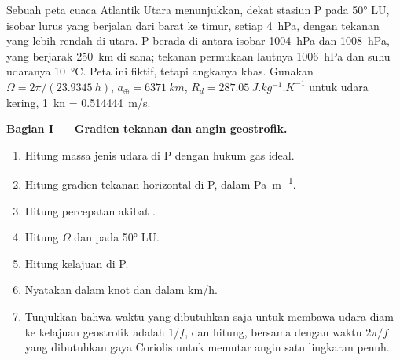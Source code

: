 \begin{problem}
\label{pb:b1:atmospheric-circulation:1}
Sebuah peta cuaca Atlantik Utara menunjukkan, dekat stasiun P pada \ang{50} LU, isobar lurus
yang berjalan dari barat ke timur, setiap \qty{4}{hPa}, dengan tekanan yang lebih rendah di utara.
P berada di antara isobar \qty{1004}{hPa} dan \qty{1008}{hPa}, yang berjarak
\qty{250}{km} di sana; tekanan permukaan lautnya \qty{1006}{hPa} dan suhu udaranya
\qty{10}{\degreeCelsius}. Peta ini fiktif, tetapi angkanya khas.
Gunakan $\Omega = 2\pi/(\qty{23.9345}{h})$, $a_\oplus = \qty{6371}{km}$, $R_d =
\qty{287.05}{J.kg^{-1}.K^{-1}}$ untuk udara kering, \qty{1}{kn} = \qty{0.514444}{m/s}.

\medskip
\noindent\textbf{Bagian I --- Gradien tekanan dan angin geostrofik.}
\begin{enumerate}
  \item Hitung massa jenis udara di P dengan hukum gas ideal.
  \item Hitung gradien tekanan horizontal di P, dalam \unit{Pa.m^{-1}}.
  \item Hitung percepatan akibat .
  \item Hitung $\Omega$ dan  pada \ang{50} LU.
  \item Hitung kelajuan  di P.
  \item Nyatakan dalam knot dan dalam \unit{km/h}.
  \item Tunjukkan bahwa waktu yang dibutuhkan  saja untuk membawa
        udara diam ke kelajuan geostrofik adalah $1/f$, dan hitung, bersama dengan
        waktu $2\pi/f$ yang dibutuhkan gaya Coriolis untuk memutar angin satu lingkaran penuh.
\end{enumerate}


\end{problem}
